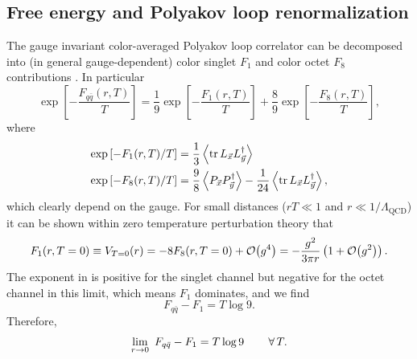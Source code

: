 \subsection{Free energy and Polyakov loop renormalization}
The gauge invariant color-averaged Polyakov loop correlator can be decomposed
into (in general gauge-dependent) color singlet $F_1$ and color octet $F_8$
contributions
\cite{mclerran_monte_1981,mclerran_quark_1981,nadkarni_non-abelian_1986}.
In particular
\begin{equation}\label{eq:channels}
  \exp\left[-\frac{F_{q\bar{q}}(r,T)}{T}\right]
  =\frac{1}{9}\exp\left[-\frac{F_1(r,T)}{T}\right]
   +\frac{8}{9}\exp\left[-\frac{F_8(r,T)}{T}\right],
\end{equation}
where
\begin{equation}\begin{aligned}
 \exp\left[-F_1(r,T)/T\right]
   &=\frac{1}{3}\ev{\tr L_{\vec{x}}L^\dagger_{\vec{y}}}\\
  \exp\left[-F_8(r,T)/T\right]
    &=\frac{9}{8}\ev{P_{\vec{x}}P^\dagger_{\vec{y}}}
     -\frac{1}{24}\ev{\tr L_{\vec{x}}L^\dagger_{\vec{y}}},
\end{aligned}\end{equation}
which clearly depend on the gauge.
For small distances ($rT\ll1$ and $r\ll1/\Lambda_{\text{QCD}}$) it can
be shown within zero temperature perturbation theory
\cite{kaczmarek_heavy_2002} that
\begin{equation}\label{eq:Fperturb}\begin{aligned}
  F_1(r,T=0)\equiv V_{T=0}(r)
            =-8F_8(r,T=0)+\order{g^4}
            =-\frac{g^2}{3\pi r}\left(1+\order{g^2}\right).
\end{aligned}\end{equation}
The exponent in  is positive for the singlet channel
but negative for the octet channel in this limit, which means $F_1$ dominates,
and we find
\begin{equation}
  F_{q\bar{q}}-F_1=T\log 9.
\end{equation}
Therefore,
\begin{equation}\label{eq:Tlog9}
  \lim_{r\to0}~F_{q\bar{q}}-F_1=T\log 9\qquad\operatorname{\forall} T.
\end{equation}

